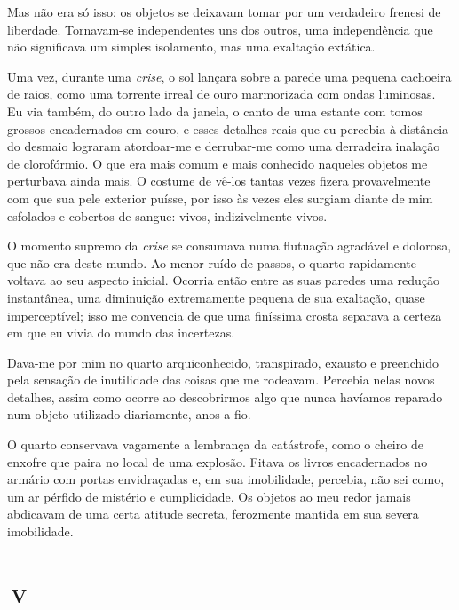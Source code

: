 Mas não era só isso: os objetos se deixavam tomar por um verdadeiro frenesi de liberdade. Tornavam-se independentes uns dos outros, uma independência que não significava um simples isolamento, mas uma exaltação extática.


Uma vez, durante uma \textit{crise}, o sol lançara sobre a parede uma pequena cachoeira de raios, como uma torrente irreal de ouro marmorizada com ondas luminosas. Eu via também, do outro lado da janela, o canto de uma estante com tomos grossos encadernados em couro, e esses detalhes reais que eu percebia à distância do desmaio lograram atordoar-me e derrubar-me como uma derradeira inalação de clorofórmio. O que era mais comum e mais conhecido naqueles objetos me perturbava ainda mais. O costume de vê-los tantas vezes fizera provavelmente com que sua pele exterior puísse, por isso às vezes eles surgiam diante de mim esfolados e cobertos de sangue: vivos, indizivelmente vivos.

O momento supremo da \textit{crise} se consumava numa flutuação agradável e dolorosa, que não era deste mundo. Ao menor ruído de passos, o quarto rapidamente voltava ao seu aspecto inicial. Ocorria então entre as suas paredes uma redução instantânea, uma diminuição extremamente pequena de sua exaltação, quase imperceptível; isso me convencia de que uma finíssima crosta separava a certeza em que eu vivia do mundo das incertezas.

Dava-me por mim no quarto arquiconhecido, transpirado, exausto e preenchido pela sensação de inutilidade das coisas que me rodeavam. Percebia nelas novos detalhes, assim como ocorre ao descobrirmos algo que nunca havíamos reparado num objeto utilizado diariamente, anos a fio.

O quarto conservava vagamente a lembrança da catástrofe, como o cheiro de enxofre que paira no local de uma explosão. Fitava os livros encadernados no armário com portas envidraçadas e, em sua imobilidade, percebia, não sei como, um ar pérfido de mistério e cumplicidade. Os objetos ao meu redor jamais abdicavam de uma certa atitude secreta, ferozmente mantida em sua severa imobilidade.


\chapter*{\small{}\,\Large\centering\textsc{v}\,\small{}}

